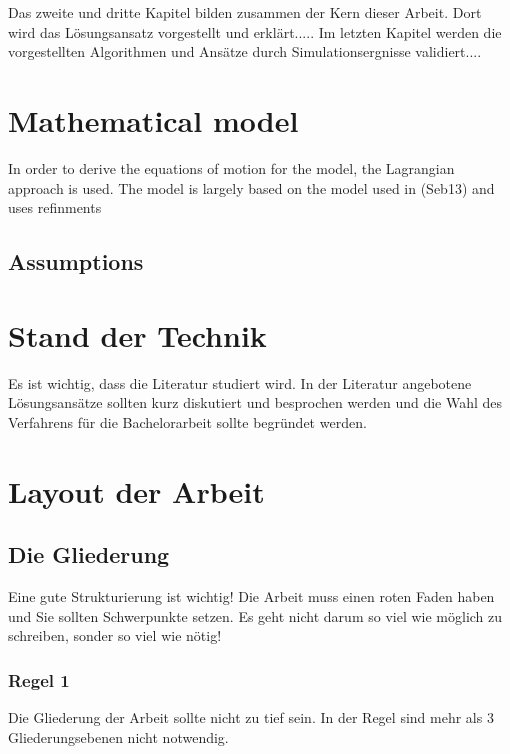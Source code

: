 \documentclass[12pt]{article}
\begin{document}
   Das zweite und dritte Kapitel bilden zusammen der Kern dieser Arbeit. Dort wird das Lösungsansatz vorgestellt und erklärt.....
   Im letzten Kapitel werden die vorgestellten Algorithmen und Ansätze durch Simulationsergnisse validiert....




\newpage
\section{Mathematical model}
In order to derive the equations of motion for the model, the Lagrangian approach is used. The model is largely based on the model used in (Seb13) and uses refinments 
\subsection{Assumptions}



\newpage
\section{Stand der Technik}
Es ist wichtig, dass die Literatur studiert wird. In der Literatur angebotene Lösungsansätze sollten kurz diskutiert und besprochen werden und die Wahl des Verfahrens für die Bachelorarbeit sollte begründet werden.
\newpage


\section{Layout der Arbeit}

\subsection{Die Gliederung}

Eine gute Strukturierung ist wichtig! Die Arbeit muss einen roten Faden haben und Sie sollten Schwerpunkte setzen. Es geht nicht darum so viel wie möglich zu schreiben, sonder so viel wie nötig!

\subsubsection{Regel 1}
Die Gliederung der Arbeit sollte nicht zu tief sein. In der Regel sind mehr als 3 Gliederungsebenen nicht notwendig.
\end{document}
